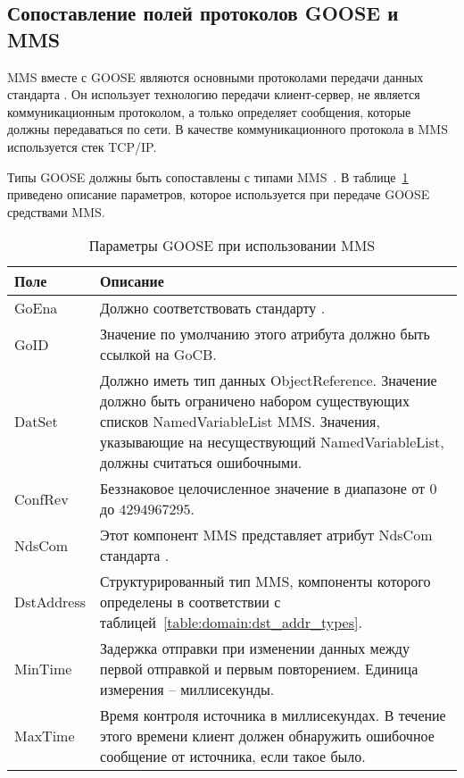 \subsection{Сопоставление полей протоколов GOOSE и MMS}

MMS вместе с GOOSE являются основными протоколами передачи данных стандарта
\iecStd. Он использует технологию передачи клиент-сервер, не является
коммуникационным протоколом, а только определяет сообщения, которые должны
передаваться по сети. В качестве коммуникационного протокола в MMS используется
стек TCP/IP.

Типы GOOSE должны быть сопоставлены с типами MMS~\cite{IEC61850_7_2}.
В таблице~\ref{table:domain:goose_mms_equality} приведено описание параметров,
которое используется при передаче GOOSE средствами MMS.

\begin{table}[ht]
    \caption{Параметры GOOSE при использовании MMS}
    \label{table:domain:goose_mms_equality}
    \begin{tabular}{| >{\raggedright}m{}
                    | >{\raggedright\arraybackslash}m{}|}
        \hline
        \centering Поле & \centering\arraybackslash Описание \\

        \hline
        GoEna & Должно соответствовать стандарту \iecStdRef72. \\

        \hline
        GoID & Значение по умолчанию этого атрибута должно быть ссылкой на GoCB. \\

        \hline
        DatSet &
        Должно иметь тип данных ObjectReference. Значение должно быть ограничено
        набором существующих списков NamedVariableList MMS. Значения, указывающие
        на несуществующий NamedVariableList, должны считаться ошибочными. \\

        \hline
        ConfRev &
        Беззнаковое целочисленное значение в диапазоне от 0 до $ 4294967295 $. \\

        \hline
        NdsCom &
        Этот компонент MMS представляет атрибут NdsCom стандарта \iecStdRef72. \\

        \hline
        DstAddress &
        Структурированный тип MMS, компоненты которого определены в соответствии
        с таблицей~\ref{table:domain:dst_addr_types}. \\

        \hline
        MinTime &
        Задержка отправки при изменении данных между первой отправкой и
        первым повторением. Единица измерения -- миллисекунды. \\

        \hline
        MaxTime &
        Время контроля источника в миллисекундах. В течение этого времени клиент
        должен обнаружить ошибочное сообщение от источника, если такое было. \\

        \hline
    \end{tabular}
\end{table}

\fixTableSectionSpace


